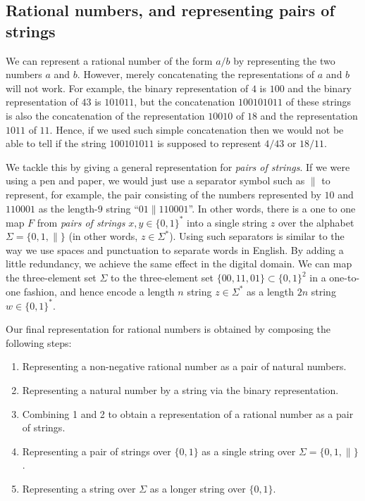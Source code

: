 \subsection{Rational numbers, and representing pairs of
strings}\label{Rational-numbers-and-repr}

We can represent a rational number of the form \(a/b\) by representing
the two numbers \(a\) and \(b\). However, merely concatenating the
representations of \(a\) and \(b\) will not work. For example, the
binary representation of \(4\) is \(100\) and the binary representation
of \(43\) is \(101011\), but the concatenation \(100101011\) of these
strings is also the concatenation of the representation \(10010\) of
\(18\) and the representation \(1011\) of \(11\). Hence, if we used such
simple concatenation then we would not be able to tell if the string
\(100101011\) is supposed to represent \(4/43\) or \(18/11\).

We tackle this by giving a general representation for \emph{pairs of
strings}. If we were using a pen and paper, we would just use a
separator symbol such as \(\|\) to represent, for example, the pair
consisting of the numbers represented by \(10\) and \(110001\) as the
length-\(9\) string ``\(01\|110001\)''. In other words, there is a one
to one map \(F\) from \emph{pairs of strings} \(x,y \in \{0,1\}^*\) into
a single string \(z\) over the alphabet \(\Sigma = \{0,1,\| \}\) (in
other words, \(z\in \Sigma^*\)). Using such separators is similar to the
way we use spaces and punctuation to separate words in English. By
adding a little redundancy, we achieve the same effect in the digital
domain. We can map the three-element set \(\Sigma\) to the three-element
set \(\{00,11,01 \} \subset \{0,1\}^2\) in a one-to-one fashion, and
hence encode a length \(n\) string \(z\in \Sigma^*\) as a length \(2n\)
string \(w\in \{0,1\}^*\).

Our final representation for rational numbers is obtained by composing
the following steps:

\begin{enumerate}
\def\labelenumi{\arabic{enumi}.}
\item
  Representing a non-negative rational number as a pair of natural
  numbers.
\item
  Representing a natural number by a string via the binary
  representation.
\item
  Combining 1 and 2 to obtain a representation of a rational number as a
  pair of strings.
\item
  Representing a pair of strings over \(\{0,1\}\) as a single string
  over \(\Sigma = \{0,1,\|\}\).
\item
  Representing a string over \(\Sigma\) as a longer string over
  \(\{0,1\}\).
\end{enumerate}

